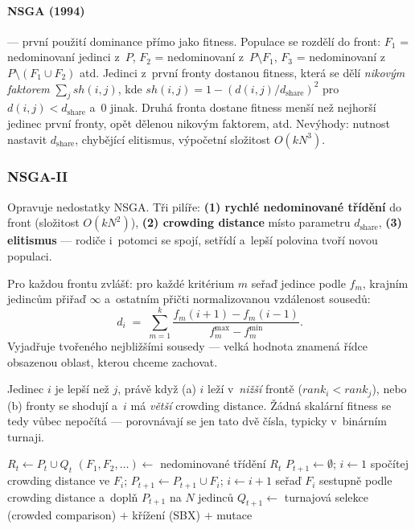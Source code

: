 \documentclass[11pt,a4paper]{article}
\theoremstyle{definition}
\begin{document}
\paragraph{NSGA (1994)} --- první použití dominance přímo jako fitness.
Populace se rozdělí do front: $F_1$ = nedominovaní jedinci z~$P$,
$F_2$ = nedominovaní z~$P \setminus F_1$, $F_3$ = nedominovaní
z~$P \setminus (F_1 \cup F_2)$ atd. Jedinci z~první fronty dostanou
 fitness, která se dělí \emph{nikovým faktorem}
$\sum_j sh(i,j)$, kde
$sh(i,j) = 1 - (d(i,j)/d_{\mathrm{share}})^2$ pro $d(i,j) < d_{\mathrm{share}}$
a~0 jinak. Druhá fronta dostane fitness menší než nejhorší jedinec první
fronty, opět dělenou nikovým faktorem, atd.
Nevýhody: nutnost nastavit $d_{\mathrm{share}}$, chybějící elitismus,
výpočetní složitost $O(kN^3)$.

\subsubsection{NSGA-II}

\begin{defbox}
Opravuje nedostatky NSGA. Tři pilíře:
\textbf{(1) rychlé nedominované třídění} do front (složitost $O(kN^2)$),
\textbf{(2) crowding distance} místo parametru $d_{\mathrm{share}}$,
\textbf{(3) elitismus} --- rodiče i~potomci se spojí, setřídí a~lepší polovina
tvoří novou populaci.
\end{defbox}

\begin{defbox}
Pro každou frontu zvlášť: pro každé kritérium $m$ seřaď jedince podle $f_m$,
krajním jedincům přiřaď $\infty$ a~ostatním přičti normalizovanou vzdálenost
sousedů:
\[
d_i \;=\; \sum_{m=1}^{k}
\frac{f_m(i+1) - f_m(i-1)}{f_m^{\max} - f_m^{\min}} .
\]
Vyjadřuje  tvořeného nejbližšími sousedy --- velká hodnota
znamená řídce obsazenou oblast, kterou chceme zachovat.
\end{defbox}

\begin{defbox}
Jedinec $i$ je lepší než $j$, právě když
(a) $i$ leží v~\emph{nižší} frontě ($rank_i < rank_j$), nebo
(b) fronty se shodují a~$i$ má \emph{větší} crowding distance.
Žádná skalární fitness se tedy vůbec nepočítá --- porovnávají se jen tato
dvě čísla, typicky v~binárním turnaji.
\end{defbox}

\begin{algorithm}[!ht]
\caption{NSGA-II (jedna generace)}
\begin{algorithmic}[1]
\State $R_t \gets P_t \cup Q_t$ 
\State $(F_1, F_2, \dots) \gets$ nedominované třídění $R_t$
\State $P_{t+1} \gets \emptyset$; $i \gets 1$
  \State spočítej crowding distance ve $F_i$; $P_{t+1} \gets P_{t+1} \cup F_i$; $i \gets i+1$
\EndWhile
\State seřaď $F_i$ sestupně podle crowding distance a~doplň $P_{t+1}$ na $N$ jedinců
\State $Q_{t+1} \gets$ turnajová selekce (crowded comparison) $+$ křížení (SBX) $+$ mutace
\end{algorithmic}
\end{algorithm}
\end{document}
